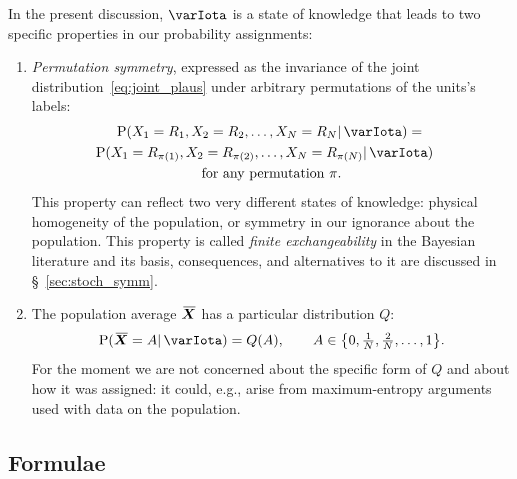 \documentclass{article}
\theoremstyle{remark}
\theoremstyle{innote}
\newcommand*{\citep}{\parencites}
\renewcommand*{\|}{\mathpunct{|}}%
\DeclarePairedDelimiter\set{\{}{\}}
\newcommand*{\p}{\mathrm{P}}%
\newcommand*{\sect}{\S}%
\newcommand*{\eg}{{e.g.}}
\theoremstyle{simple}
\newcommand*{\widebar}[1]{{\mkern1.5mu\skew{2}\overline{\mkern-1.5mu#1\mkern-1.5mu}\mkern 1.5mu}}
\newcommand*{\av}{\widebar} %
\newcommand*{\yX}{\bm{X}}%
\newcommand*{\yXf}{\av{\yX}}%
\newcommand*{\yH}{\varIota}
\begin{document}
In the present discussion, $\yH$ is a state of knowledge that leads to two
specific properties in our probability assignments:

\medskip
\begin{enumerate}%
\item \emph{Permutation symmetry}, expressed as the invariance of the
  joint distribution~\eqref{eq:joint_plaus} under arbitrary permutations of
  the units's labels:
\begin{multline}
  \label{eq:homog_math}
  \p(X_1=R_1, X_2=R_2, \dotsc, X_N=R_N \| \yH) ={}
\\ 
\shoveright{\p(X_1=R_{\pi(1)}, X_2=R_{\pi(2)}, \dotsc, X_N=R_{\pi(N)} \| \yH)}
\\
\text{for any permutation $\pi$}.
\end{multline}
This property can reflect two very different states of knowledge: physical
homogeneity of the population, or symmetry in our ignorance about the population.
This property is called \emph{finite exchangeability} in the Bayesian
literature and its basis, consequences, and alternatives to it are discussed
in \sect~\ref{sec:stoch_symm}.

\medskip

\item The population average $\yXf$ has a particular distribution $Q$:
\begin{equation}
  \label{eq:pop_average_Q}
  \p(\yXf = A \| \yH)
=  Q(A),
\qquad
A \in \set*{0,\tfrac{1}{N},\tfrac{2}{N},\dotsc,1}.
\end{equation}
For the moment we are not concerned about the specific form of $Q$ and
about how it was assigned: it could, \eg, arise from maximum-entropy
arguments
\citep[\eg:][]{jaynes1957,jaynes1963,good1963,jaynes1967,aczeletal1975,jaynes1979b,vancampenhoutetal1981,sivia1990,fangetal1997,bretthorst2013}
used with data on the population.
\end{enumerate}

\subsection{Formulae}
\label{sec:main_formulae}
\end{document}
